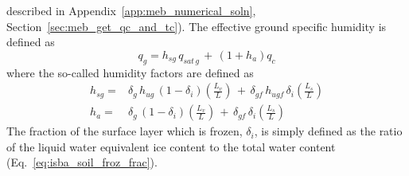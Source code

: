 described in Appendix~\ref{app:meb_numerical_soln}, 
Section~\ref{sec:meb_get_qc_and_tc}).
The effective ground specific humidity is defined as
%
\begin{equation}
\label{eq:meb_q_ground}
%
q_{g} = h_{sg} \, q_{sat\,g} \,+\, \left(1+h_a\right) q_c
%
\end{equation}
%
where the so-called humidity factors are defined as
%
\begin{align}
\label{eq:meb_hg_ground}
%
h_{sg} =& 
\delta_{g} \, h_{ug}\, \left(1-\delta_i\right) 
\left({\frac{L_v}{L}}\right)
\,+\, 
\delta_{gf} \, h_{ugf}\, \delta_i \left({\frac{L_s}{L}}\right)
\\
\label{eq:meb_ha_ground}
h_a =& 
\delta_{g} \, \left(1-\delta_i\right) 
\left({\frac{L_v}{L}}\right)
\,+\, 
\delta_{gf} \, \delta_i \left({\frac{L_s}{L}}\right)
%
\end{align}
%
The fraction of the surface layer which is frozen, $\delta_i$, is simply
defined as the ratio of the liquid water equivalent ice content to the
total water content (Eq.~\ref{eq:isba_soil_froz_frac}).


